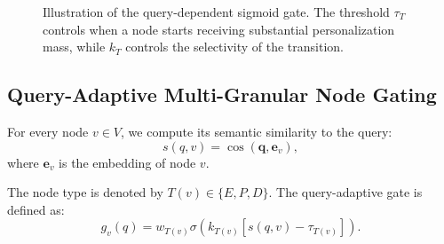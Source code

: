 \documentclass[conference]{IEEEtran}
\newcommand{\q}{q}
\begin{document}
\begin{figure}[t]
\centering


\caption{
Illustration of the query-dependent sigmoid gate. The threshold
$\tau_T$ controls when a node starts receiving substantial
personalization mass, while $k_T$ controls the selectivity of the
transition.
}
\label{fig:gate}
\end{figure}


\subsection{Query-Adaptive Multi-Granular Node Gating}

For every node $v\in V$, we compute its semantic similarity to the
query:
\begin{equation}
s(\q,v)
=
\cos(\mathbf{q},\mathbf{e}_v),
\label{eq:similarity}
\end{equation}
where $\mathbf{e}_v$ is the embedding of node $v$.

The node type is denoted by $T(v)\in\{E,P,D\}$. The query-adaptive
gate is defined as:
\begin{equation}
g_v(\q)
=
w_{T(v)}
\sigma
\left(
k_{T(v)}
\left[
s(\q,v)-\tau_{T(v)}
\right]
\right).
\label{eq:nodegate}
\end{equation}
\end{document}
